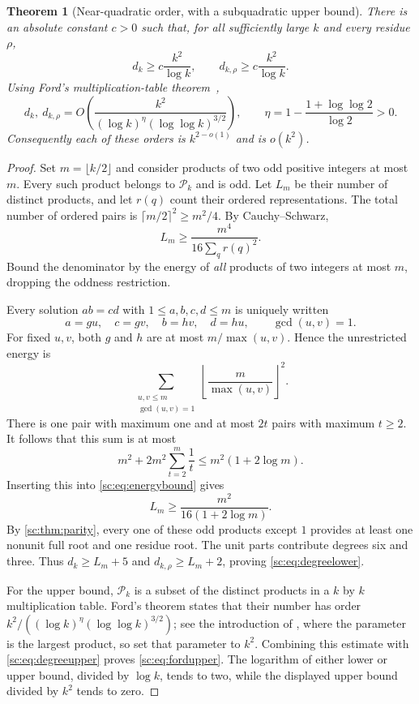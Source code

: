 \documentclass[11pt,a4paper]{article}
\numberwithin{equation}{section}
\newtheorem{theorem}{Theorem}[section]
\theoremstyle{definition}
\theoremstyle{remark}
\begin{document}
\begin{theorem}[Near-quadratic order, with a subquadratic upper bound]\label{sc:thm:degreegrowth}
There is an absolute constant $c>0$ such that, for all sufficiently large
$k$ and every residue $\rho$,
\begin{equation}\label{sc:eq:degreelower}
 d_k\ge c\frac{k^2}{\log k},\qquad
 d_{k,\rho}\ge c\frac{k^2}{\log k}.
\end{equation}
Using Ford's multiplication-table theorem~\cite{FordShort,FordAnnals},
\begin{equation}\label{sc:eq:fordupper}
 d_k,\ d_{k,\rho}
 =O\!\left(\frac{k^2}{(\log k)^\eta(\log\log k)^{3/2}}\right),
 \qquad
 \eta=1-\frac{1+\log\log2}{\log2}>0.
\end{equation}
Consequently each of these orders is $k^{2-o(1)}$ and is $o(k^2)$.
\end{theorem}
\begin{proof}
Set $m=\lfloor k/2\rfloor$ and consider products of two odd positive
integers at most $m$. Every such product belongs to $\mathcal P_k$ and is odd.
Let $L_m$ be their number of distinct products, and let $r(q)$ count their
ordered representations. The total number of ordered pairs is
$\lceil m/2\rceil^2\ge m^2/4$. By Cauchy--Schwarz,
\begin{equation}\label{sc:eq:energybound}
 L_m\ge \frac{m^4}{16\sum_q r(q)^2}.
\end{equation}
Bound the denominator by the energy of \emph{all} products of two
integers at most $m$, dropping the oddness restriction.

Every solution $ab=cd$ with $1\le a,b,c,d\le m$ is uniquely written
\[
 a=gu,\quad c=gv,\quad b=hv,\quad d=hu,
 \qquad \gcd(u,v)=1.
\]
For fixed $u,v$, both $g$ and $h$ are at most $m/\max(u,v)$. Hence the
unrestricted energy is
\[
 \sum_{\substack{u,v\le m\\\gcd(u,v)=1}}
       \left\lfloor\frac m{\max(u,v)}\right\rfloor^2.
\]
There is one pair with maximum one and at most $2t$ pairs with maximum
$t\ge2$. It follows that this sum is at most
\[
 m^2+2m^2\sum_{t=2}^m\frac1t
       \le m^2(1+2\log m).
\]
Inserting this into \eqref{sc:eq:energybound} gives
\begin{equation}\label{sc:eq:oddproducts}
 L_m\ge\frac{m^2}{16(1+2\log m)}.
\end{equation}
By \cref{sc:thm:parity}, every one of these odd products except $1$ provides
at least one nonunit full root and one residue root. The unit parts
contribute degrees six and three. Thus
$d_k\ge L_m+5$ and $d_{k,\rho}\ge L_m+2$, proving
\eqref{sc:eq:degreelower}.

For the upper bound, $\mathcal P_k$ is a subset of the distinct products in a
$k$ by $k$ multiplication table. Ford's theorem states that their number
has order
$k^2/((\log k)^\eta(\log\log k)^{3/2})$; see the introduction of
\cite{FordShort}, where the parameter is the largest product, so set
that parameter to $k^2$. Combining this estimate with
\eqref{sc:eq:degreeupper} proves \eqref{sc:eq:fordupper}.
The logarithm of either lower or upper bound, divided by $\log k$, tends
to two, while the displayed upper bound divided by $k^2$ tends to zero.
\end{proof}
\end{document}
